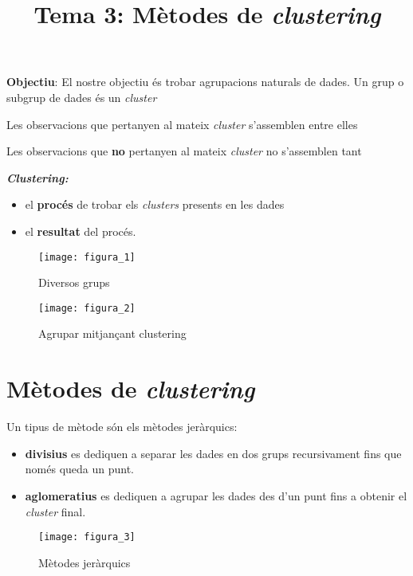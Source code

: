 \documentclass[a4paper]{article}
\title{Tema 3: Mètodes de \emph{clustering}}
\begin{document}
	
\maketitle

\textbf{Objectiu}: El nostre objectiu és trobar agrupacions naturals de dades. Un grup o subgrup de dades és un \emph{cluster}

Les observacions que pertanyen al mateix \emph{cluster} s'assemblen entre elles

Les observacions que \textbf{no} pertanyen al mateix \emph{cluster} no s'assemblen tant

\textbf{\emph{Clustering:}}
\begin{itemize}
	\item el \textbf{procés} de trobar els \emph{clusters} presents en les dades
	\item el \textbf{resultat} del procés.
\end{itemize}

\begin{figure}[h!]
    \centering
    \begin{minipage}[t]{0.49\textwidth}
        \centering
        \texttt{[image: figura\_1]}
        \caption{Diversos grups}
    \end{minipage}
    \hfill
    \begin{minipage}[t]{0.49\textwidth}
        \centering
        \texttt{[image: figura\_2]}
        \caption{Agrupar mitjançant clustering}
    \end{minipage}
\end{figure}

\section{Mètodes de \emph{clustering}}

Un tipus de mètode són els mètodes jeràrquics:
\begin{itemize}
	\item \textbf{divisius} es dediquen a separar les dades en dos grups recursivament fins que només queda un punt.
	\item \textbf{aglomeratius} es dediquen a agrupar les dades des d'un punt fins a obtenir el \emph{cluster} final.
\end{itemize}

\begin{figure}[H]
    \centering
    \texttt{[image: figura\_3]}
    \caption{Mètodes jeràrquics}
\end{figure}
\end{document}
